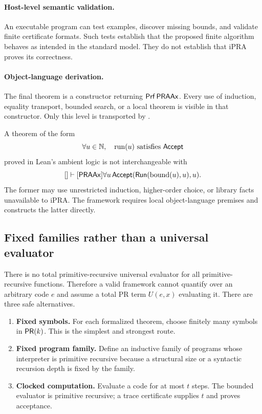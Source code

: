 \paragraph{Host-level semantic validation.}
An executable program can test examples, discover missing bounds, and validate
finite certificate formats.  Such tests establish that the proposed finite
algorithm behaves as intended in the standard model.  They do not establish
that iPRA proves its correctness.

\paragraph{Object-language derivation.}
The final theorem is a constructor returning \(\mathsf{Prf}\,\mathsf{PRAAx}\).  Every use of
induction, equality transport, bounded search, or a local theorem is visible in
that constructor.  Only this level is transported by .

\begin{warning}
A theorem of the form
\[
  \forall u\in\mathbb N,\quad \operatorname{run}(u)\text{ satisfies }\mathsf{Accept}
\]
proved in Lean's ambient logic is not interchangeable with
\[
  []\vdash[\mathsf{PRAAx}]\forall u\,\mathsf{Accept}(\mathsf{Run}(\operatorname{bound}(u),u),u).
\]
The former may use unrestricted induction, higher-order choice, or library
facts unavailable to iPRA.  The framework requires local object-language
premises and constructs the latter directly.
\end{warning}

\subsection{Fixed families rather than a universal evaluator}

There is no total primitive-recursive universal evaluator for all primitive-
recursive functions.  Therefore a valid framework cannot quantify over an
arbitrary code \(e\) and assume a total PR term \(U(e,x)\) evaluating it.
There are three safe alternatives.

\begin{enumerate}
\item \textbf{Fixed symbols.}  For each formalized theorem, choose finitely many
symbols in \(\mathsf{PR}(k)\).  This is the simplest and strongest route.
\item \textbf{Fixed program family.}  Define an inductive family of programs
whose interpreter is primitive recursive because a structural size or a
syntactic recursion depth is fixed by the family.
\item \textbf{Clocked computation.}  Evaluate a code for at most \(t\) steps.
The bounded evaluator is primitive recursive; a trace certificate supplies
\(t\) and proves acceptance.
\end{enumerate}

